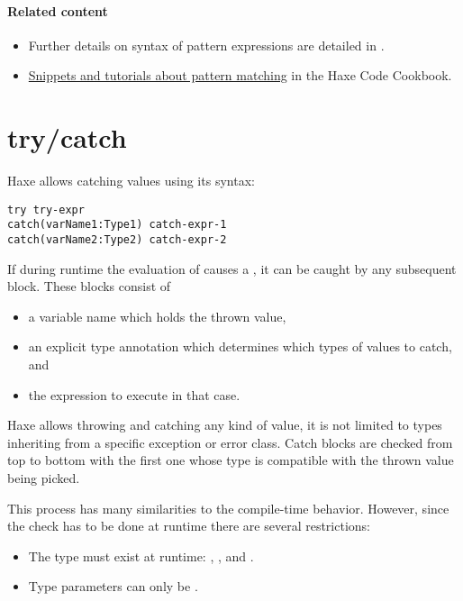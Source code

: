 \paragraph{Related content}
\begin{itemize}
	\item Further details on syntax of pattern expressions are detailed in .
	\item \href{http://code.haxe.org/tag/pattern-matching.html}{Snippets and tutorials about pattern matching} in the Haxe Code Cookbook.
\end{itemize}


\section{try/catch}
\label{expression-try-catch}

Haxe allows catching values using its  syntax:

\begin{lstlisting}
try try-expr
catch(varName1:Type1) catch-expr-1
catch(varName2:Type2) catch-expr-2
\end{lstlisting}

If during runtime the evaluation of  causes a , it can be caught by any subsequent  block. These blocks consist of

\begin{itemize}
	\item a variable name which holds the thrown value,
	\item an explicit type annotation which determines which types of values to catch, and
	\item the expression to execute in that case.
\end{itemize}

Haxe allows throwing and catching any kind of value, it is not limited to types inheriting from a specific exception or error class. Catch blocks are checked from top to bottom with the first one whose type is compatible with the thrown value being picked.

This process has many similarities to the compile-time  behavior. However, since the check has to be done at runtime there are several restrictions:

\begin{itemize}
	\item The type must exist at runtime: , ,  and .
	\item Type parameters can only be .
\end{itemize}



